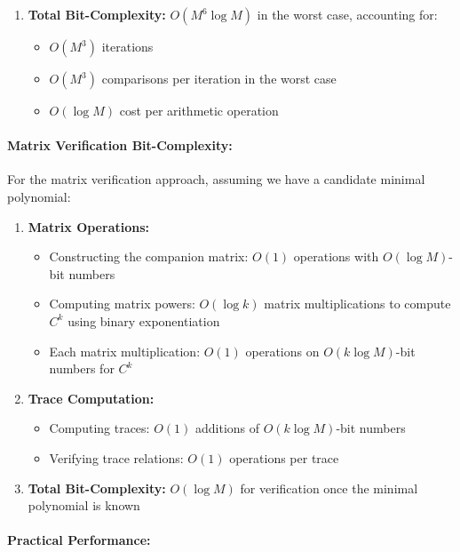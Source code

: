 \begin{response}
\begin{enumerate}
\item \textbf{Total Bit-Complexity:} $O(M^6 \log M)$ in the worst case, accounting for:
   \begin{itemize}
   \item $O(M^3)$ iterations
   \item $O(M^3)$ comparisons per iteration in the worst case
   \item $O(\log M)$ cost per arithmetic operation
   \end{itemize}
\end{enumerate}

\paragraph{Matrix Verification Bit-Complexity:}

For the matrix verification approach, assuming we have a candidate minimal polynomial:

\begin{enumerate}
\item \textbf{Matrix Operations:} 
   \begin{itemize}
   \item Constructing the companion matrix: $O(1)$ operations with $O(\log M)$-bit numbers
   \item Computing matrix powers: $O(\log k)$ matrix multiplications to compute $C^k$ using binary exponentiation
   \item Each matrix multiplication: $O(1)$ operations on $O(k \log M)$-bit numbers for $C^k$
   \end{itemize}

\item \textbf{Trace Computation:} 
   \begin{itemize}
   \item Computing traces: $O(1)$ additions of $O(k \log M)$-bit numbers
   \item Verifying trace relations: $O(1)$ operations per trace
   \end{itemize}

\item \textbf{Total Bit-Complexity:} $O(\log M)$ for verification once the minimal polynomial is known
\end{enumerate}

\paragraph{Practical Performance:}


\end{response}
